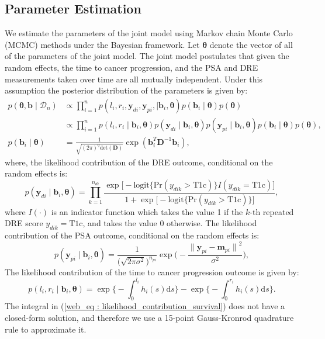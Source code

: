 \subsection{Parameter Estimation}
We estimate the parameters of the joint model using Markov chain Monte Carlo (MCMC) methods under the Bayesian framework. Let $\boldsymbol{\theta}$ denote the vector of all of the parameters of the joint model. The joint model postulates that given the random effects, the time to cancer progression, and the PSA and DRE measurements taken over time are all mutually independent. Under this assumption the posterior distribution of the parameters is given by:
\begin{align*}
p(\boldsymbol{\theta}, \boldsymbol{b} \mid \mathcal{D}_n) & \propto \prod_{i=1}^n p(l_i, r_i, \boldsymbol{y}_{di}, \boldsymbol{y}_{pi}, \mid \boldsymbol{b}_i, \boldsymbol{\theta}) p(\boldsymbol{b}_i \mid \boldsymbol{\theta}) p(\boldsymbol{\theta})\\
& \propto \prod_{i=1}^n p(l_i, r_i \mid \boldsymbol{b}_i, \boldsymbol{\theta}) p(\boldsymbol{y}_{di} \mid \boldsymbol{b}_i, \boldsymbol{\theta}) p(\boldsymbol{y}_{pi} \mid \boldsymbol{b}_i, \boldsymbol{\theta}) p(\boldsymbol{b}_i \mid \boldsymbol{\theta}) p(\boldsymbol{\theta}),\\
p(\boldsymbol{b}_i \mid \boldsymbol{\theta}) &= \frac{1}{\sqrt{(2 \pi)^q \text{det}(\boldsymbol{D})}} \exp(\boldsymbol{b}_i^T \boldsymbol{D}^{-1} \boldsymbol{b}_i),
\end{align*}
where, the likelihood contribution of the DRE outcome, conditional on the random effects is:
\begin{equation*}
p(\boldsymbol{y}_{di} \mid \boldsymbol{b}_i, \boldsymbol{\theta}) = \prod_{k=1}^{n_{di}} \frac{\exp\Big[-\mbox{logit} \big\{\mbox{Pr}(y_{dik} > \mbox{T1c})\big\} I(y_{dik}=\mbox{T1c}) \Big]}  {1+\exp\Big[-\mbox{logit} \big\{\mbox{Pr}(y_{dik} > \mbox{T1c})\big\}\Big]},
\end{equation*}
where $I(\cdot)$ is an indicator function which takes the value 1 if the $k$-th repeated DRE score ${y_{dik}=\mbox{T1c}}$, and takes the value 0 otherwise. The likelihood contribution of the PSA outcome, conditional on the random effects is:
\begin{equation*}
p(\boldsymbol{y}_{pi} \mid \boldsymbol{b}_i, \boldsymbol{\theta}) = \frac{1}{\big(\sqrt{2 \pi \sigma^2}\big)^{n_{pi}}} \exp\bigg(-\frac{{\lVert{\boldsymbol{y}_{pi} - \boldsymbol{m}_{pi}}\rVert}^2}{\sigma^2}\bigg),
\end{equation*}
The likelihood contribution of the time to cancer progression outcome is given by:
\begin{equation}
\label{web_eq : likelihood_contribution_survival}
p(l_i,r_i\mid \boldsymbol{b}_i,\boldsymbol{\theta}) = \exp\Big\{-\int_0^{l_i} h_i(s)\mathrm{d}{s}\Big\} - \exp\Big\{-\int_0^{r_i}h_i(s)\mathrm{d}{s}\Big\}.
\end{equation}
The integral in (\ref{web_eq : likelihood_contribution_survival}) does not have a closed-form solution, and therefore we use a 15-point Gauss-Kronrod quadrature rule to approximate it.


